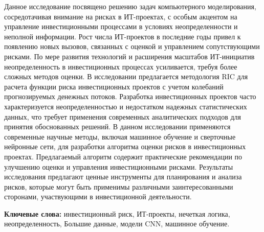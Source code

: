 Данное исследование посвящено решению задач компьютерного моделирования,
сосредотачивая внимание на рисках в ИТ-проектах, с особым акцентом на
управление инвестиционными процессами в условиях неопределенности и
неполной информации. Рост числа ИТ-проектов в последние годы привел к
появлению новых вызовов, связанных с оценкой и управлением
сопутствующими рисками. По мере развития технологий и расширения
масштабов ИТ-инициатив неопределенность в инвестиционных процессах
усиливается, требуя более сложных методов оценки. В исследовании
предлагается методология RIC для расчета функции риска инвестиционных
проектов с учетом колебаний прогнозируемых денежных потоков. Разработка
инвестиционных проектов часто характеризуется неопределенностью и
недостатком надежных статистических данных, что требует применения
современных аналитических подходов для принятия обоснованных решений. В
данном исследовании применяются современные научные методы, включая
машинное обучение и сверточные нейронные сети, для разработки алгоритма
оценки рисков в инвестиционных проектах. Предлагаемый алгоритм содержит
практические рекомендации по улучшению оценки и управления
инвестиционными рисками. Результаты исследования предлагают ценные
инструменты для планирования и анализа рисков, которые могут быть
применимы различными заинтересованными сторонами, участвующими в
инвестиционной деятельности.

{\bfseries Ключевые слова:} инвестиционный риск, ИТ-проекты, нечеткая
логика, неопределенность, Большие данные, модели CNN, машинное обучение.

